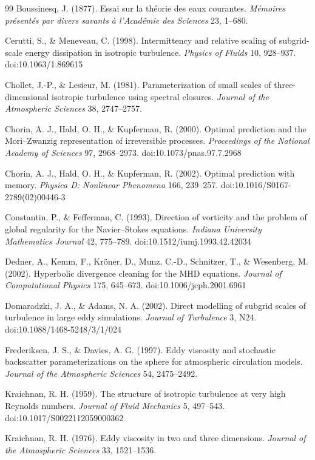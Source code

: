 \documentclass[aps,prfluids,preprint,superscriptaddress,nofootinbib]{revtex4-2}
\begin{document}
\begin{thebibliography}{99}
Boussinesq, J. (1877). Essai sur la théorie des eaux courantes. \emph{Mémoires présentés par divers savants à l'Académie des Sciences} 23, 1–680.

Cerutti, S., \& Meneveau, C. (1998). Intermittency and relative scaling of subgrid-scale energy dissipation in isotropic turbulence. \emph{Physics of Fluids} 10, 928–937. doi:10.1063/1.869615

Chollet, J.-P., \& Lesieur, M. (1981). Parameterization of small scales of three-dimensional isotropic turbulence using spectral closures. \emph{Journal of the Atmospheric Sciences} 38, 2747–2757.

Chorin, A. J., Hald, O. H., \& Kupferman, R. (2000). Optimal prediction and the Mori–Zwanzig representation of irreversible processes. \emph{Proceedings of the National Academy of Sciences} 97, 2968–2973. doi:10.1073/pnas.97.7.2968

Chorin, A. J., Hald, O. H., \& Kupferman, R. (2002). Optimal prediction with memory. \emph{Physica D: Nonlinear Phenomena} 166, 239–257. doi:10.1016/S0167-2789(02)00446-3

Constantin, P., \& Fefferman, C. (1993). Direction of vorticity and the problem of global regularity for the Navier–Stokes equations. \emph{Indiana University Mathematics Journal} 42, 775–789. doi:10.1512/iumj.1993.42.42034

Dedner, A., Kemm, F., Kröner, D., Munz, C.-D., Schnitzer, T., \& Wesenberg, M. (2002). Hyperbolic divergence cleaning for the MHD equations. \emph{Journal of Computational Physics} 175, 645–673. doi:10.1006/jcph.2001.6961

Domaradzki, J. A., \& Adams, N. A. (2002). Direct modelling of subgrid scales of turbulence in large eddy simulations. \emph{Journal of Turbulence} 3, N24. doi:10.1088/1468-5248/3/1/024

Frederiksen, J. S., \& Davies, A. G. (1997). Eddy viscosity and stochastic backscatter parameterizations on the sphere for atmospheric circulation models. \emph{Journal of the Atmospheric Sciences} 54, 2475–2492.

Kraichnan, R. H. (1959). The structure of isotropic turbulence at very high Reynolds numbers. \emph{Journal of Fluid Mechanics} 5, 497–543. doi:10.1017/S0022112059000362

Kraichnan, R. H. (1976). Eddy viscosity in two and three dimensions. \emph{Journal of the Atmospheric Sciences} 33, 1521–1536.


\end{thebibliography}
\end{document}
